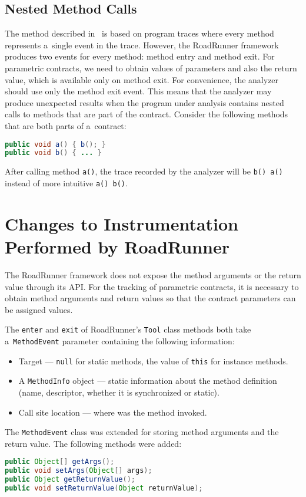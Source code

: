\subsection{Nested Method Calls}

The method described in~\cite{contracts} is based on program traces where
every method represents a~single event in the trace. However, the RoadRunner
framework produces two events for every method: method entry and method exit.
For parametric contracts, we need to obtain values of parameters and also the
return value, which is available only on method exit. For convenience, the
analyzer should use only the method exit event. This means that the analyzer may
produce unexpected results when the program under analysis contains nested calls
to methods that are part of the contract. Consider the following methods that
are both parts of a~contract:
\begin{lstlisting}[language=java, frame=none]
public void a() { b(); }
public void b() { ... }
\end{lstlisting}
After calling method \texttt{a()}, the trace recorded by the analyzer will be
\texttt{b() a()} instead of more intuitive \texttt{a() b()}.

\section{Changes to Instrumentation Performed by RoadRunner}
\label{instrChanges}

The RoadRunner framework does not expose the method arguments or the return
value through its API. For the tracking of parametric contracts, it is necessary
to obtain method arguments and return values so that the contract parameters
can be assigned values.

The \texttt{enter} and \texttt{exit} of RoadRunner's \texttt{Tool} class methods
both take a~\texttt{MethodEvent} parameter containing the following information:
\begin{itemize}
    \item Target --- \texttt{null} for static methods, the value of \texttt{this}
        for instance methods.
    \item A \texttt{MethodInfo} object --- static information about the method
        definition (name, descriptor, whether it is synchronized or static).
    \item Call site location --- where was the method invoked.
\end{itemize}
The \texttt{MethodEvent} class was extended for storing method arguments and the
return value. The following methods were added:
\begin{lstlisting}[language=java, frame=none]
public Object[] getArgs();
public void setArgs(Object[] args);
public Object getReturnValue();
public void setReturnValue(Object returnValue);
\end{lstlisting}


